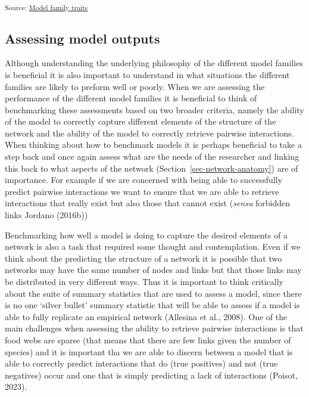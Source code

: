 \documentclass[
]{article}
\begin{document}
\textsubscript{Source:
\href{https://BecksLab.github.io/ms_t_is_for_topology/notebooks/model_qualitative-preview.html\#cell-fig-dendo}{Model
family traits}}

\subsection{Assessing model outputs}\label{assessing-model-outputs}

Although understanding the underlying philosophy of the different model
families is beneficial it is also important to understand in what
situations the different families are likely to preform well or poorly.
When we are assessing the performance of the different model families it
is beneficial to think of benchmarking these assessments based on two
broader criteria, namely the ability of the model to correctly capture
different elements of the structure of the network and the ability of
the model to correctly retrieve pairwise interactions. When thinking
about how to benchmark models it is perhaps beneficial to take a step
back and once again assess what are the needs of the researcher and
linking this back to what aspects of the network
(Section~\ref{sec-network-anatomy}) are of importance. For example if we
are concerned with being able to successfully predict pairwise
interactions we want to ensure that we are able to retrieve interactions
that really exist but also those that cannot exist (\emph{sensu}
forbidden links Jordano (2016b))

Benchmarking how well a model is doing to capture the desired elements
of a network is also a task that required some thought and
contemplation. Even if we think about the predicting the structure of a
network it is possible that two networks may have the same number of
nodes and links but that those links may be distributed in very
different ways. Thus it is important to think critically about the suite
of summary statistics that are used to assess a model, since there is no
one `silver bullet' summary statistic that will be able to assess if a
model is able to fully replicate an empirical network (Allesina et al.,
2008). One of the main challenges when assessing the ability to retrieve
pairwise interactions is that food webs are sparse (that means that
there are few links given the number of species) and it is important tha
we are able to discern between a model that is able to correctly predict
interactions that do (true positives) and not (true negatives) occur and
one that is simply predicting a lack of interactions (Poisot, 2023).
\end{document}
